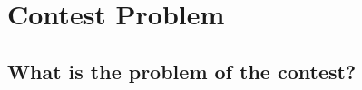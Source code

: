 \documentclass[notheorems]{beamer}
\theoremstyle{plain}
\theoremstyle{definition}
\theoremstyle{remark}
\begin{document}

\section{Contest Problem}

\subsection{What is the problem of the contest?}
\end{document}
